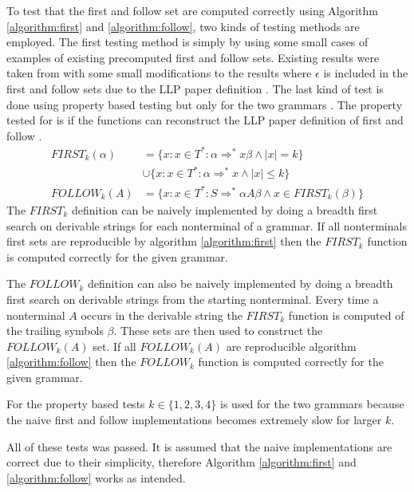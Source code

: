 To test that the first and follow set are computed correctly using Algorithm \ref{algorithm:first} and \ref{algorithm:follow}, two kinds of testing methods are employed. The first testing method is simply by using some small cases of examples of existing precomputed first and follow sets. Existing results were taken from \cite[58, 62, 63, 65]{Mogensen} with some small modifications to the results where $\epsilon$ is included in the first and follow sets due to the LLP paper definition \cite[5]{Vagner2007}. The last kind of test is done using property based testing but only for the two grammars \cite[62, 63]{Mogensen}. The property tested for is if the functions can reconstruct the LLP paper definition of first and follow \cite[5]{Vagner2007}.
\begin{align*}
    FIRST_k(\alpha) &= \{x : x \in T^* : \alpha \Rightarrow^* x \beta \land |x| = k\} \\ 
    \, &\cup \{x : x \in T^* : \alpha \Rightarrow^* x \land |x| \leq k\} \\
    FOLLOW_k(A) &= \{x : x \in T^* : S \Rightarrow^* \alpha A \beta \land x \in FIRST_k(\beta)\}
\end{align*}
The $FIRST_k$ definition can be naively implemented by doing a breadth first search on derivable strings for each nonterminal of a grammar. If all nonterminals first sets are reproducible by algorithm \ref{algorithm:first} then the $FIRST_k$ function is computed correctly for the given grammar.

The $FOLLOW_k$ definition can also be naively implemented by doing a breadth first search on derivable strings from the starting nonterminal. Every time a nonterminal $A$ occurs in the derivable string the $FIRST_k$ function is computed of the trailing symbols $\beta$. These sets are then used to construct the $FOLLOW_k(A)$ set. If all $FOLLOW_k(A)$ are reproducible algorithm \ref{algorithm:follow} then the $FOLLOW_k$ function is computed correctly for the given grammar.

For the property based tests $k \in \{1, 2, 3, 4\}$ is used for the two grammars because the naive first and follow implementations becomes extremely slow for larger $k$.

All of these tests was passed. It is assumed that the naive implementations are correct due to their simplicity, therefore Algorithm \ref{algorithm:first} and \ref{algorithm:follow} works as intended.
